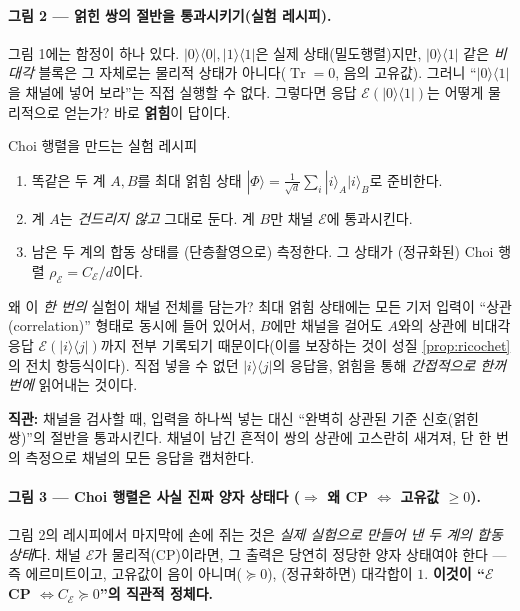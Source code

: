 \documentclass[11pt,a4paper]{article}
\newcommand{\E}{\mathcal{E}}
\newcommand{\Tr}{\operatorname{Tr}}
\theoremstyle{definition}
\theoremstyle{plain}
\theoremstyle{remark}
\begin{document}
\paragraph{그림 2 --- 얽힌 쌍의 절반을 통과시키기(실험 레시피).}
그림 1에는 함정이 하나 있다. $|0\rangle\langle0|,|1\rangle\langle1|$은 실제 상태(밀도행렬)지만, $|0\rangle\langle1|$ 같은 \emph{비대각} 블록은 그 자체로는 물리적 상태가 아니다($\Tr=0$, 음의 고유값). 그러니 ``$|0\rangle\langle1|$을 채널에 넣어 보라''는 직접 실행할 수 없다. 그렇다면 응답 $\E(|0\rangle\langle1|)$는 어떻게 물리적으로 얻는가? 바로 \textbf{얽힘}이 답이다.

\begin{conceptbox}{Choi 행렬을 만드는 실험 레시피}
\begin{enumerate}[leftmargin=1.6em]
  \item 똑같은 두 계 $A,B$를 최대 얽힘 상태 $|\Phi\rangle=\tfrac1{\sqrt d}\sum_i|i\rangle_A|i\rangle_B$로 준비한다.
  \item 계 $A$는 \emph{건드리지 않고} 그대로 둔다. 계 $B$만 채널 $\E$에 통과시킨다.
  \item 남은 두 계의 합동 상태를 (단층촬영으로) 측정한다. 그 상태가 (정규화된) Choi 행렬 $\rho_\E=C_\E/d$이다.
\end{enumerate}
\end{conceptbox}

왜 이 \emph{한 번의} 실험이 채널 전체를 담는가? 최대 얽힘 상태에는 모든 기저 입력이 ``상관(correlation)'' 형태로 동시에 들어 있어서, $B$에만 채널을 걸어도 $A$와의 상관에 비대각 응답 $\E(|i\rangle\langle j|)$까지 전부 기록되기 때문이다(이를 보장하는 것이 성질 \ref{prop:ricochet}의 전치 항등식이다). 직접 넣을 수 없던 $|i\rangle\langle j|$의 응답을, 얽힘을 통해 \emph{간접적으로 한꺼번에} 읽어내는 것이다.

\begin{intuitionbox}
\textbf{직관:} 채널을 검사할 때, 입력을 하나씩 넣는 대신 ``완벽히 상관된 기준 신호(얽힌 쌍)''의 절반을 통과시킨다. 채널이 남긴 흔적이 쌍의 상관에 고스란히 새겨져, 단 한 번의 측정으로 채널의 모든 응답을 캡처한다.
\end{intuitionbox}

\paragraph{그림 3 --- Choi 행렬은 사실 진짜 양자 상태다 ($\Rightarrow$ 왜 CP $\iff$ 고유값 $\ge0$).}
그림 2의 레시피에서 마지막에 손에 쥐는 것은 \emph{실제 실험으로 만들어 낸 두 계의 합동 상태}다. 채널 $\E$가 물리적(CP)이라면, 그 출력은 당연히 정당한 양자 상태여야 한다 --- 즉 에르미트이고, 고유값이 음이 아니며($\succeq0$), (정규화하면) 대각합이 $1$. \textbf{이것이 ``$\E$ CP $\iff C_\E\succeq0$''의 직관적 정체다.}
\end{document}
